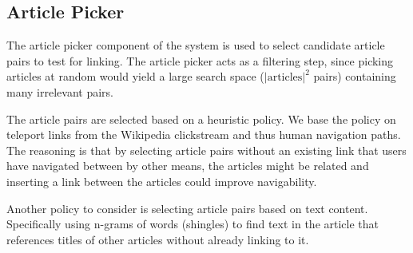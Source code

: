\subsection{Article Picker}
The article picker component of the system is used to select candidate article pairs to test for linking. The article picker acts as a filtering step, since picking articles at random would yield a large search space ($\left\vert{\text{articles}}\right\vert ^{2}$ pairs) containing many irrelevant pairs.

The article pairs are selected based on a heuristic policy. We base the policy on teleport links  from the Wikipedia clickstream and thus human navigation paths. The reasoning is that by selecting article pairs without an existing link that users have navigated between by other means, the articles might be related and inserting a link between the articles could improve navigability.

Another policy to consider is selecting article pairs based on text content. Specifically using n-grams of words (shingles) to find text in the article that references titles of other articles without already linking to it. 

